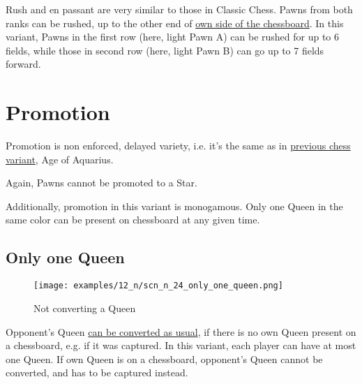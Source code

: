 Rush and en passant are very similar to those in Classic Chess.\newline
\indent
Pawns from both ranks can be rushed, up to the other end of
\hyperref[sec:Definitions/Chessboard sides, navigation]{own side of the chessboard}.\newline
\indent
In this variant, Pawns in the first row (here, light Pawn A) can be rushed for up
to 6 fields, while those in second row (here, light Pawn B) can go up to 7 fields
forward.



\vspace*{-0.9\baselineskip}
\noindent
\section*{Promotion}
\label{sec:Nineteen/Promotion}

Promotion is non enforced, delayed variety, i.e. it's the same as in
\hyperref[sec:Age of Aquarius/Promotion]{previous chess variant}, Age of Aquarius.

Again, Pawns cannot be promoted to a Star.

Additionally, promotion in this variant is monogamous.
Only one Queen in the same color can be present on chessboard at any given time.

\clearpage %

\subsection*{Only one Queen}
\label{sec:Nineteen/Sideways Pawns/Only one Queen}

\vspace*{-1.1\baselineskip}
\noindent
\begin{figure}[!h]
\texttt{[image: examples/12\_n/scn\_n\_24\_only\_one\_queen.png]}
\caption{Not converting a Queen}
\label{fig:scn_n_24_only_one_queen}
\end{figure}

Opponent's Queen
\hyperref[sec:Mayan Ascendancy/Pyramid/Conversion]{can be converted as usual},
if there is no own Queen present on a chessboard, e.g. if it was captured.
In this variant, each player can have at most one Queen. If own Queen is on
a chessboard, opponent's Queen cannot be converted, and has to be captured
instead.

